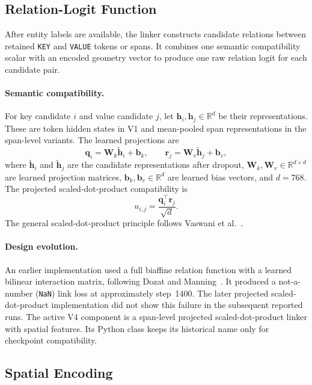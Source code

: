 \subsection{Relation-Logit Function}
\label{sec:kv-attention}

After entity labels are available, the linker constructs candidate relations
between retained \texttt{KEY} and \texttt{VALUE} tokens or spans. It combines
one semantic compatibility scalar with an encoded geometry vector to produce
one raw relation logit for each candidate pair.

\paragraph{Semantic compatibility.}
For key candidate $i$ and value candidate $j$, let
$\mathbf{h}_i,\mathbf{h}_j\in\mathbb{R}^{d}$ be their representations.
These are token hidden states in V1 and mean-pooled span representations in the
span-level variants. The learned projections are
\[
  \mathbf{q}_i
  =\mathbf{W}_k\widetilde{\mathbf{h}}_i+\mathbf{b}_k,
  \qquad
  \mathbf{r}_j
  =\mathbf{W}_v\widetilde{\mathbf{h}}_j+\mathbf{b}_v,
\]
where $\widetilde{\mathbf{h}}_i$ and $\widetilde{\mathbf{h}}_j$ are the
candidate representations after dropout,
$\mathbf{W}_k,\mathbf{W}_v\in\mathbb{R}^{d\times d}$ are learned
projection matrices, $\mathbf{b}_k,\mathbf{b}_v\in\mathbb{R}^{d}$ are
learned bias vectors, and $d=768$. The projected scaled-dot-product
compatibility is
\[
  u_{i,j}
  =\frac{\mathbf{q}_i^\top\mathbf{r}_j}{\sqrt{d}}.
\]
The general scaled-dot-product principle follows
Vaswani et al.~\cite{vaswani2017attention}.

\paragraph{Design evolution.}
An earlier implementation used a full biaffine relation function with a
learned bilinear interaction matrix, following Dozat and
Manning~\cite{dozat2017biaffine}. It produced a not-a-number
(\texttt{NaN}) link loss at approximately step~1400. The later projected
scaled-dot-product implementation did not show this failure in the subsequent
reported runs. The active V4 component is a span-level projected
scaled-dot-product linker with spatial features. Its Python class keeps its
historical name only for checkpoint compatibility.

\subsection{Spatial Encoding}
\label{sec:spatial-encoding}

